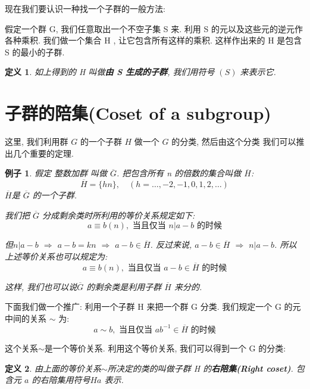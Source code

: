 \documentclass[utf8]{ctexbook}
\newtheorem{definition}{定义}[section]
\newtheorem{example}{例子}[section]
\begin{document}
现在我们要认识一种找一个子群的一般方法:

假定一个群 G, 我们任意取出一个不空子集 S 来. 利用 S 的元以及这些元的逆元作各种乘积. 我们做一个集合 H , 让它包含所有这样的乘积. 这样作出来的 H 是包含 S 的最小的子群.
\begin{definition}
如上得到的 H 叫做\textbf{由 S 生成的子群}, 我们用符号 $(S)$ 来表示它.
\end{definition}

\section{子群的陪集(Coset of a subgroup)}

这里, 我们利用群 $G$ 的一个子群 $H$ 做一个 $G$ 的分类, 然后由这个分类 我们可以推出几个重要的定理.

\begin{example}\label{example_integer_additive_group}
假定 整数加群 叫做 $\overline{G}$. 把包含所有 n 的倍数的集合叫做 $\overline{H}$:
\begin{equation}
\overline{H} = \{ hn \}, \quad (h=\ldots, -2, -1, 0, 1, 2, \ldots)
\end{equation}
$\overline{H}$是 $\overline{G}$ 的一个子群.

我们把 $\overline{G}$ 分成剩余类时所利用的等价关系规定如下:
\begin{equation}
a \equiv b (n), \mbox{ 当且仅当 } n | a-b \mbox{  的时候}
\end{equation}

但$n|a-b$ $\Longrightarrow$ $a-b=kn$ $\Longrightarrow$ $a-b \in \overline{H}$. 反过来说, $a-b \in \overline{H}$ $\Longrightarrow$ $n|a-b$. 所以上述等价关系也可以规定为:
\begin{equation}
a \equiv b (n), \mbox{ 当且仅当 } a-b \in \overline{H} \mbox{  的时候}
\end{equation}

这样, 我们也可以说$\overline{G}$ 的剩余类是利用子群 $\overline{H}$ 来分的.
\end{example}


下面我们做一个推广: 利用一个子群 H 来把一个群 G 分类. 我们规定一个 G 的元中间的关系 $\sim$ 为:
\begin{equation}
a \sim b, \mbox{ 当且仅当 } a b^{-1} \in \overline{H} \mbox{  的时候}
\end{equation}

这个关系$\sim$是一个等价关系. 利用这个等价关系, 我们可以得到一个 G 的分类:

\begin{definition}
由上面的等价关系$\sim$所决定的类的叫做子群 H 的\textbf{右陪集(Right coset)}.  包含元 $a$ 的右陪集用符号$Ha$ 表示. 
\end{definition}
\end{document}
